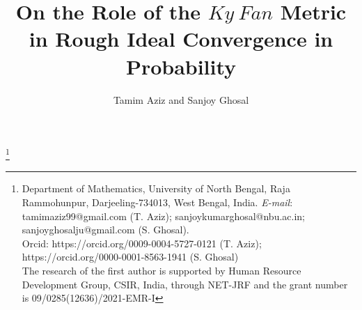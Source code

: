 \documentclass[reqno]{amsart}
\begin{document}
	\theoremstyle{plain}
	\theoremstyle{definition}
	
	\newtheorem{theorem}{Theorem}[section]
	\newtheorem{problem}[theorem]{Problem}
	\newtheorem{proposition}[theorem]{Proposition}
	\newtheorem{corollary}[theorem]{Corollary}
	\newtheorem{lemma}[theorem]{Lemma}
	\newtheorem{example}[theorem]{Example}
	\newtheorem{remark}[theorem]{Remark}
	\newtheorem{definition}[theorem]{Definition}
	\newtheorem{fact}[theorem]{Fact}
	\newtheorem{claim}[theorem]{Claim}
	\newtheorem{note}{\textbf{Note}}[section]
	
	\large
	\title[On the role of the $Ky~Fan$ metric in rough ideal convergence in probability]{On the Role of the $Ky~Fan$ Metric in Rough Ideal Convergence in Probability}	
	
	
	
	
	\date{}
		
	\author[Tamim Aziz and Sanjoy Ghosal]{Tamim Aziz and Sanjoy Ghosal}
	\thanks{Department of Mathematics, University of North Bengal, Raja Rammohunpur, Darjeeling-734013, West Bengal, India. \emph{E-mail}: tamimaziz99@gmail.com (T. Aziz); sanjoykumarghosal@nbu.ac.in; sanjoyghosalju@gmail.com (S. Ghosal). \\ Orcid: https://orcid.org/0009-0004-5727-0121 (T. Aziz);  https://orcid.org/0000-0001-8563-1941 (S. Ghosal)\\	The research of the first author is supported by Human Resource Development Group, CSIR, India, through NET-JRF and the grant number is 09/0285(12636)/2021-EMR-I}
	
	
	
		\setcounter {page}{1}
	
\end{document}
